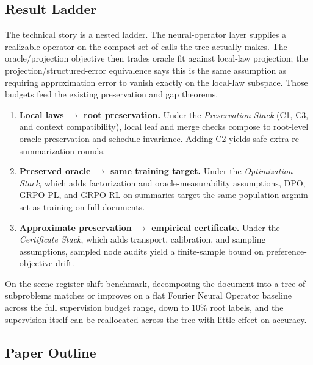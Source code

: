 \subsection{Result Ladder}

The technical story is a nested ladder. The neural-operator layer supplies a realizable operator on the compact set of calls the tree actually makes. The oracle/projection objective then trades oracle fit against local-law projection; the projection/structured-error equivalence says this is the same assumption as requiring approximation error to vanish exactly on the local-law subspace. Those budgets feed the existing preservation and gap theorems.
\begin{enumerate}[leftmargin=1.5em]
    \item \textbf{Local laws $\rightarrow$ root preservation.} Under the \emph{Preservation Stack} (C1, C3, and context compatibility), local leaf and merge checks compose to root-level oracle preservation and schedule invariance. Adding C2 yields safe extra re-summarization rounds.
    \item \textbf{Preserved oracle $\rightarrow$ same training target.} Under the \emph{Optimization Stack}, which adds factorization and oracle-measurability assumptions, DPO, GRPO-PL, and GRPO-RL on summaries target the same population argmin set as training on full documents.
    \item \textbf{Approximate preservation $\rightarrow$ empirical certificate.} Under the \emph{Certificate Stack}, which adds transport, calibration, and sampling assumptions, sampled node audits yield a finite-sample bound on preference-objective drift.
\end{enumerate}

On the scene-register-shift benchmark, decomposing the document into a tree of subproblems matches or improves on a flat Fourier Neural Operator baseline across the full supervision budget range, down to $10\%$ root labels, and the supervision itself can be reallocated across the tree with little effect on accuracy.

\subsection{Paper Outline}

